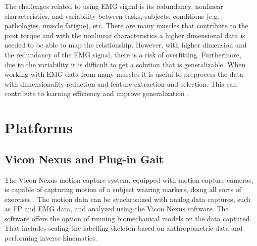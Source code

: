\documentclass[../main.tex]{subfiles}
\begin{document}
The challenges related to using \ac{EMG} signal is its redundancy, nonlinear characteristics, and variability between tasks, subjects, conditions (e.g. pathologies, muscle fatigue), etc.
There are many muscles that contribute to the joint torque and with the nonlinear characteristics a higher dimensional data is needed to be able to map the relationship.
However, with higher dimension and the redundancy of the \ac{EMG} signal, there is a risk of overfitting.
Furthermore, due to the variability it is difficult to get a solution that is generalizable.
When working with \ac{EMG} data from many muscles it is useful to preprocess the data with dimensionality reduction and feature extraction and selection. This can contribute to learning efficiency and improve generalization \cite{Chen2018, Marsland2014}.

\section{Platforms}
\label{sec:A-Platforms}
\subsection{Vicon Nexus and Plug-in Gait}
\label{sec:A-Vicon-and-PiG}
The Vicon Nexus motion capture system, equipped with motion capture cameras, is capable of capturing motion of a subject wearing markers, doing all sorts of exercises \cite{vicon-user-guide}.
The motion data can be synchronized with analog data captures, such as \ac{FP} and \ac{EMG} data, and analyzed using the Vicon Nexus software.
The software offers the option of running biomechanical models on the data captured. 
That includes scaling the labelling skeleton based on anthropometric data and performing inverse kinematics.
\end{document}
